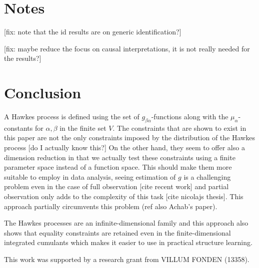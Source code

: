 \documentclass[accepted]{uai2021} %
\begin{document}
\section{Notes}

[fix: note that the id results are on generic identification?]

[fix: maybe reduce the focus on causal interpretations, it is not really needed 
for 
the results?]


\section{Conclusion}

A Hawkes process is defined using the set of $g_{\beta\alpha}$-functions along 
with the $\mu_\alpha$-constants for $\alpha,\beta$ in the finite set $V$. The 
constraints that are shown to exist in this paper are not the only constraints 
imposed by the distribution of the Hawkes process [do I actually know this?] On 
the other hand, they seem to offer also a dimension reduction in that we 
actually test these constraints using a finite parameter space instead of a 
function space. This should make them more suitable to employ in data analysis, 
seeing estimation of $g$ is a challenging problem even in the case of full 
observation [cite recent work] and partial observation only adds to the 
complexity of this task [cite nicolajs thesis]. This approach partially 
circumvents this problem (ref also Achab's paper).

The Hawkes processes are an infinite-dimensional family and this approach also 
shows that equality constraints are retained even in the finite-dimensional 
integrated cumulants which makes it easier to use in practical structure 
learning.




\begin{contributions} %

\end{contributions}

\begin{acknowledgements} %
    This work was supported by a research grant from
    VILLUM FONDEN (13358).
\end{acknowledgements}
\end{document}
